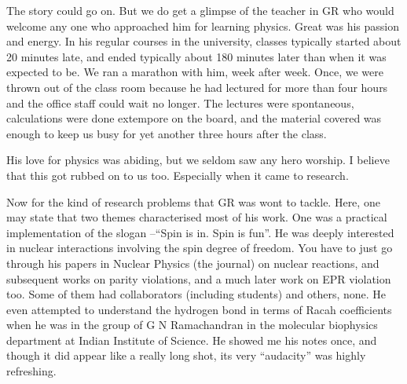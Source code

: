 The story could go on. But we do get a glimpse of the teacher in GR who would welcome any one who approached him for learning physics. Great was his passion and energy. In his regular courses in the university, classes typically started about 20 minutes late, and ended typically about 180 minutes later than when it was expected to be. We ran a marathon with him, week after week. Once, we were thrown out of the class room because he had lectured for more than four hours and the office staff could wait no longer. The lectures were spontaneous, calculations were done extempore on the board, and the material covered was enough to keep us busy for yet another three hours after the class.

His love for physics was abiding, but we seldom saw any hero worship.  I believe that this got rubbed on to us too. Especially when it came to research.

Now for the kind of research problems that GR was wont to tackle. Here, one may state that two themes characterised most of his work. One was a practical implementation of the slogan --“Spin is in. Spin is fun”. He was deeply interested in nuclear interactions involving the spin degree of freedom. You have to just go through his papers in Nuclear Physics (the journal) on nuclear reactions, and subsequent works on parity violations, and a much later work on EPR violation too. Some of them had collaborators (including students) and others, none. He even attempted to understand the hydrogen bond in terms of Racah coefficients when he was in the group of G N Ramachandran in the molecular biophysics department at Indian Institute of Science. He showed me his notes once, and though it did appear like a really long shot, its very “audacity” was highly refreshing.

